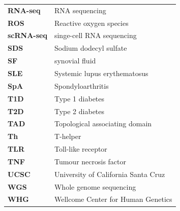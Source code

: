 \begin{longtable}{p{2.5cm}p{12.5cm}}
\textbf{RNA-seq} & RNA sequencing\\
\textbf{ROS} & Reactive oxygen species \\
\textbf{scRNA-seq} & singe-cell RNA sequencing \\
\textbf{SDS} & Sodium dodecyl sulfate \\
\textbf{SF} & synovial fluid \\
\textbf{SLE} & Systemic lupus erythematosus\\
\textbf{SpA} & Spondyloarthritis \\
\textbf{T1D} & Type 1 diabetes\\
\textbf{T2D} & Type 2 diabetes \\
\textbf{TAD} & Topological associating domain\\
\textbf{Th} & T-helper \\
\textbf{TLR} & Toll-like receptor\\
\textbf{TNF} & Tumour necrosis factor\\
\textbf{UCSC} & University of California Santa Cruz\\
\textbf{WGS} & Whole genome sequencing\\
\textbf{WHG} & Wellcome Center for Human Genetics\\
\end{longtable}
